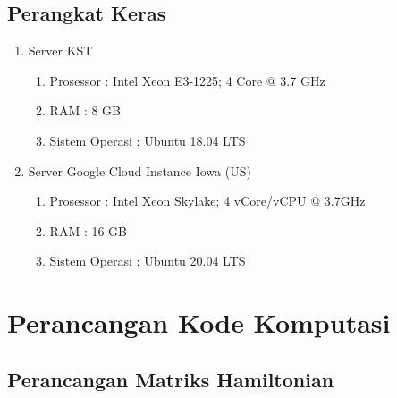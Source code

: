\documentclass[12pt,a4paper]{report}
\begin{document}
			\subsection{Perangkat Keras}
			\begin{enumerate}
				\vspace{-0.2cm} \item Server KST
				\begin{enumerate}
					\vspace{-0.8cm} \item Prosessor : Intel Xeon E3-1225; 4 Core @ 3.7 GHz
					\vspace{-0.8cm} \item RAM : 8 GB
					\vspace{-0.8cm} \item Sistem Operasi : Ubuntu 18.04 LTS
				\end{enumerate}
				\vspace{-0.8cm} \item Server Google Cloud Instance Iowa (US)
				\begin{enumerate}
					\vspace{-0.8cm} \item Prosessor : Intel Xeon Skylake; 4 vCore/vCPU @ 3.7GHz
					\vspace{-0.8cm} \item RAM : 16 GB
					\vspace{-0.8cm} \item Sistem Operasi : Ubuntu 20.04 LTS
				\end{enumerate}
			\end{enumerate}
	
	\section{Perancangan Kode Komputasi}
	\subsection{Perancangan Matriks Hamiltonian}
	
\end{document}
